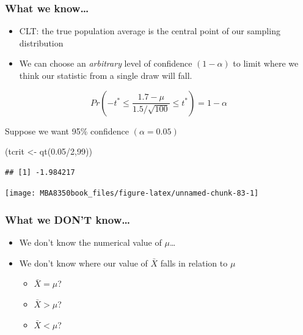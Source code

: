 \documentclass[
]{book}
\newenvironment{Shaded}{\begin{snugshade}}{\end{snugshade}}
\newcommand{\DecValTok}[1]{\textcolor[rgb]{0.00,0.00,0.81}{#1}}
\newcommand{\FloatTok}[1]{\textcolor[rgb]{0.00,0.00,0.81}{#1}}
\newcommand{\FunctionTok}[1]{\textcolor[rgb]{0.00,0.00,0.00}{#1}}
\newcommand{\NormalTok}[1]{#1}
\newcommand{\OtherTok}[1]{\textcolor[rgb]{0.56,0.35,0.01}{#1}}
\newcommand{\SpecialCharTok}[1]{\textcolor[rgb]{0.00,0.00,0.00}{#1}}
\begin{document}
\hypertarget{what-we-know}{%
\subsubsection*{What we know\ldots{}}\label{what-we-know}}

\begin{itemize}
\item
  CLT: the true population average is the central point of our sampling distribution
\item
  We can choose an \emph{arbitrary} level of confidence \((1-\alpha)\) to limit where we think our statistic from a single draw will fall.
\end{itemize}

\[Pr(-t^* \leq \frac{1.7-\mu}{1.5/\sqrt{100}} \leq t^*) = 1-\alpha\]

Suppose we want 95\% confidence \((\alpha = 0.05)\)

\begin{Shaded}
\begin{Highlighting}[]
\NormalTok{(tcrit }\OtherTok{\textless{}{-}} \FunctionTok{qt}\NormalTok{(}\FloatTok{0.05}\SpecialCharTok{/}\DecValTok{2}\NormalTok{,}\DecValTok{99}\NormalTok{))}
\end{Highlighting}
\end{Shaded}

\begin{verbatim}
## [1] -1.984217
\end{verbatim}

\begin{center}\texttt{[image: MBA8350book\_files/figure-latex/unnamed-chunk-83-1]} \end{center}

\hypertarget{what-we-dont-know}{%
\subsubsection*{What we DON'T know\ldots{}}\label{what-we-dont-know}}

\begin{itemize}
\item
  We don't know the numerical value of \(\mu\)\ldots{}
\item
  We don't know where our value of \(\bar{X}\) falls in relation to \(\mu\)

  \begin{itemize}
  \item
    \(\bar{X}=\mu\)?
  \item
    \(\bar{X}>\mu\)?
  \item
    \(\bar{X}<\mu\)?
  \end{itemize}
\end{itemize}
\end{document}
